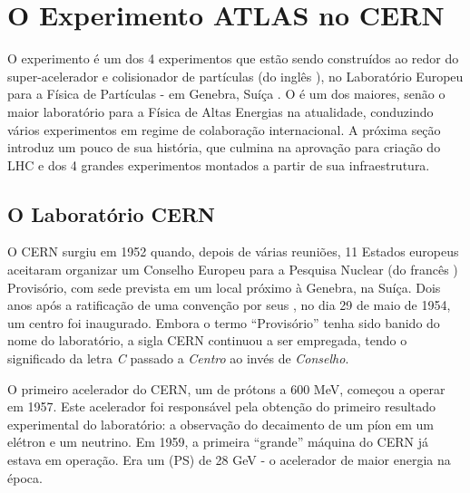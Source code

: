\typeout{ ====================================================================}
\typeout{ ====================================================================}

\chapter{O Experimento ATLAS no CERN}
\label{chap:atlas}


O experimento  é um dos 4 experimentos que estão sendo construídos
ao redor do super-acelerador e colisionador de partículas  (do inglês
), no Laboratório Europeu para a Física de
Partículas -  em Genebra, Suíça \cite{atlas-tp}. O  é um
dos maiores, senão o maior laboratório para a Física de Altas Energias na
atualidade, conduzindo vários experimentos em regime de colaboração
internacional. A próxima seção introduz um pouco de sua história, que culmina
na aprovação para criação do LHC e dos 4 grandes experimentos montados a
partir de sua infraestrutura.

\section{O Laboratório CERN}

O CERN surgiu em 1952 quando, depois de várias reuniões, 11 Estados europeus
aceitaram organizar um Conselho Europeu para a Pesquisa Nuclear (do francês
) Provisório, com sede
prevista em um local próximo à Genebra, na Suíça. Dois anos após a ratificação
de uma convenção por seus , no dia 29 de maio de 1954, um
centro foi inaugurado. Embora o termo ``Provisório'' tenha sido banido do nome
do laboratório, a sigla CERN continuou a ser empregada, tendo o significado da
letra \textit{C} passado a \textit{Centro} ao invés de \textit{Conselho}.

O primeiro acelerador do CERN, um
 de prótons a 600 MeV, começou a operar em
1957. Este acelerador foi responsável pela obtenção do primeiro resultado
experimental do laboratório: a observação do decaimento de um píon em um
elétron e um neutrino. Em 1959, a primeira ``grande'' máquina do CERN já
estava em operação. Era um  (PS) de 28 GeV - o
acelerador de maior energia na época.

